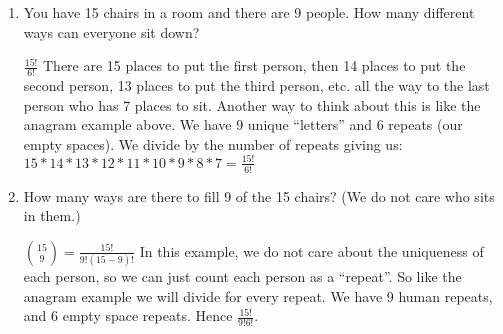 \question 
\begin{enumerate}[label=(\alph*)]
\item You have 15 chairs in a room and there are 9 people. How many different 
ways can everyone sit down?

\begin{solution} [.3 cm]
$\frac{15!}{6!}$
There are 15 places to put the first person, then 14 places to put the 
second person, 13 places to put the third person, etc. all the way to 
the last person who has 7 places to sit.
Another way to think about this is like the anagram example above. We 
have 9 unique “letters” and 6 repeats (our empty spaces). We divide by 
the number of repeats giving us:
$15*14*13*12*11*10*9*8*7 = \frac{15!}{6!}$
 \end{solution}
 
\item How many ways are there to fill 9 of the 15 chairs? (We do not 
care who sits in them.)

\begin{solution} [.3 cm]
${15 \choose 9}  = \frac{15!}{9!(15-9)!}$
In this example, we do not care about the uniqueness of each person, 
so we can just count each person as a “repeat”. So like the anagram 
example we will divide for every repeat. We have 9 human repeats, and 
6 empty space repeats. Hence $\frac{15!}{9!6!}$.
\end{solution}

\end{enumerate}